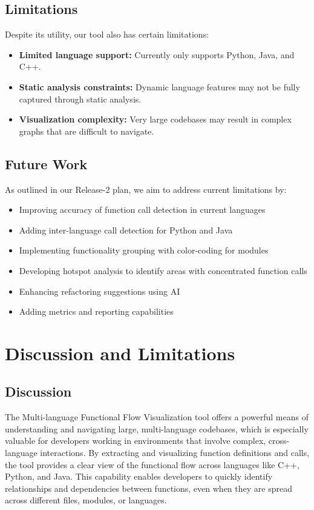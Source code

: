 \documentclass[10pt,twocolumn]{article}
\begin{document}
\subsection{Limitations}

Despite its utility, our tool also has certain limitations:
\begin{itemize}
    \item \textbf{Limited language support:} Currently only supports Python, Java, and C++.
    \item \textbf{Static analysis constraints:} Dynamic language features may not be fully captured through static analysis.
    \item \textbf{Visualization complexity:} Very large codebases may result in complex graphs that are difficult to navigate.
\end{itemize}

\subsection{Future Work}

As outlined in our Release-2 plan, we aim to address current limitations by:
\begin{itemize}
    \item Improving accuracy of function call detection in current languages
    \item Adding inter-language call detection for Python and Java
    \item Implementing functionality grouping with color-coding for modules
    \item Developing hotspot analysis to identify areas with concentrated function calls
    \item Enhancing refactoring suggestions using AI
    \item Adding metrics and reporting capabilities
\end{itemize}
\section{Discussion and Limitations}

\subsection{Discussion}

The Multi-language Functional Flow Visualization tool offers a powerful means of understanding and navigating large, multi-language codebases, which is especially valuable for developers working in environments that involve complex, cross-language interactions. By extracting and visualizing function definitions and calls, the tool provides a clear view of the functional flow across languages like C++, Python, and Java. This capability enables developers to quickly identify relationships and dependencies between functions, even when they are spread across different files, modules, or languages.
\end{document}
